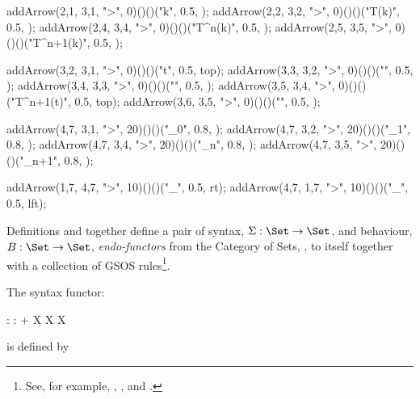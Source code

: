   addArrow(2,1, 3,1, ">", 0)()()("k",          0.5, );
  addArrow(2,2, 3,2, ">", 0)()()("T(k)",       0.5, );
  addArrow(2,4, 3,4, ">", 0)()()("T^n(k)",     0.5, );
  addArrow(2,5, 3,5, ">", 0)()()("T^{n+1}(k)", 0.5, );

  addArrow(3,2, 3,1, ">", 0)()()("t",          0.5, top);
  addArrow(3,3, 3,2, ">", 0)()()("",           0.5, );
  addArrow(3,4, 3,3, ">", 0)()()("",           0.5, );
  addArrow(3,5, 3,4, ">", 0)()()("T^{n+1}(t)", 0.5, top);
  addArrow(3,6, 3,5, ">", 0)()()("",           0.5, );

  addArrow(4,7, 3,1, ">", 20)()()("_0",     0.8, );
  addArrow(4,7, 3,2, ">", 20)()()("_1",     0.8, );
  addArrow(4,7, 3,4, ">", 20)()()("_n",     0.8, );
  addArrow(4,7, 3,5, ">", 20)()()("_{n+1}", 0.8, );
  
  addArrow(1,7, 4,7, ">", 10)()()("_{\infinity}", 0.5, rt);
  addArrow(4,7, 1,7, ">", 10)()()("_{\infinity}", 0.5, lft);

\stopMPcode \stopformula

\stopMMundi

\startMMundi


\stopMMundi

\startMMundi

Definitions \in[beastieActions] and \in[beastieTests] together define a 
pair of syntax, $\Sigma : \Set \rightarrow \Set$, and behaviour, $B : \Set 
\rightarrow \Set$, \emph{endo-functors} from the Category of Sets, \Set, 
to itself together with a collection of GSOS rules\footnote{See, for 
example, \cite{turiPlotkin1997operationalSemantics}, 
\cite{klin2011bialgebrasSOS}, and \cite{jacobs2017coalgebras}.}. 

The syntax functor: 

\placeformula[+]\startformula\startalign
  \NC \Sigma : \NC \Set \rightarrow \Set           \NR
  \NC \Sigma : \NC {} + X \times X \mapsto X \NR
\stopalign\stopformula

\noindent is defined by

